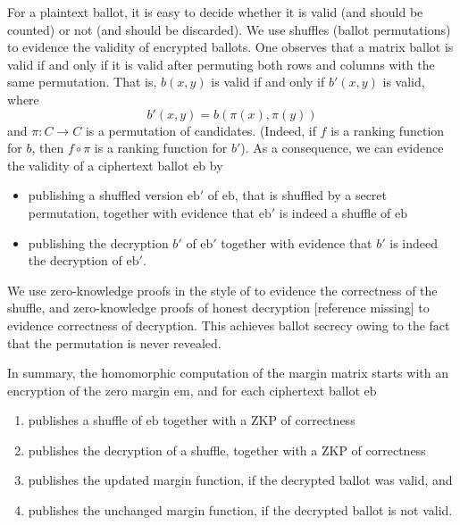 \documentclass{llncs}
\newcommand{\encb}{\mathrm{eb}}
\newcommand{\encm}{\mathrm{em}}
\begin{document}
For a plaintext ballot, it is easy to decide whether it is
valid (and should be counted) or not (and should be discarded). We
use shuffles (ballot permutations) to evidence the validity of
encrypted ballots. One observes that a matrix ballot is valid if and
only if it is valid after permuting both rows and columns with the
same permutation. That is, $b(x,y)$ is valid if and only if $b'(x,y)$
is valid, where
\[ b'(x,y) = b(\pi(x), \pi(y)) \]
and $\pi: C \to C$ is a permutation of candidates. (Indeed, if $f$
is a ranking function for $b$, then $f \circ \pi$ is a ranking
function for $b'$). As a consequence, we can evidence the validity
of a ciphertext ballot $\encb$ by
\begin{itemize}
  \item publishing a shuffled version $\encb'$ of $\encb$, that is
  shuffled by a secret permutation, together with
  evidence that $\encb'$ is indeed a shuffle of $\encb$
  \item publishing the decryption $b'$ of $\encb'$ together with
  evidence that $b'$ is indeed the decryption of $\encb'$.
\end{itemize}

We use zero-knowledge proofs in the style of \cite{Bayer:2012:EZK}
to evidence the correctness of the shuffle, and zero-knowledge
proofs of honest decryption [reference missing] to evidence
correctness of decryption. This achieves ballot secrecy owing to the
fact that the permutation is never revealed.


In summary, the homomorphic computation of the margin matrix starts
with an encryption of the zero margin $\encm$, and for each
ciphertext ballot $\encb$
\begin{enumerate}
\item publishes a shuffle of $\encb$ together with a ZKP of 
correctness
\item publishes the decryption of a shuffle, together with a ZKP of
correctness
\item publishes the updated margin function, if the decrypted ballot
was valid, and
\item publishes the unchanged margin function, if the decrypted
ballot is not valid.
\end{enumerate}
\end{document}

